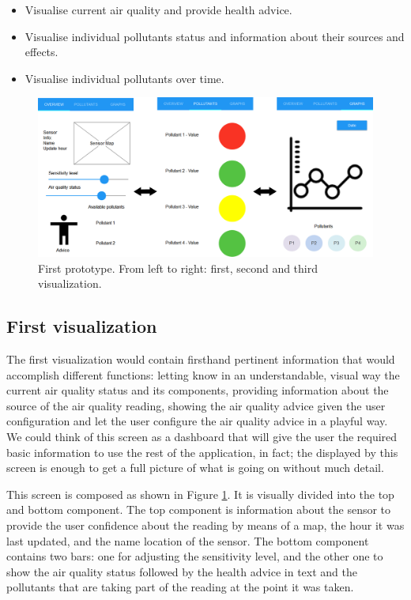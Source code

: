 \begin{itemize}
    \item Visualise current air quality and provide health advice.
    \item Visualise individual pollutants status and information about their sources and effects.
    \item Visualise individual pollutants over time.
\end{itemize}


\begin{figure}[H]
\begin{adjustbox}{width=1.2\textwidth,center=\textwidth}
  \centering
  \includegraphics[scale=1]{images/firstPrototype.png}
\end{adjustbox}
  \caption[Frist prototype]{First prototype. From left to right: first, second and third visualization.}
  \label{fig:first_visualization_first_prototype}
\end{figure}


\subsection{First visualization}

The first visualization would contain firsthand pertinent information that would accomplish different functions: letting know in an understandable, visual way the current air quality status and its components, providing information about the source of the air quality reading, showing the air quality advice given the user configuration and let the user configure the air quality advice in a playful way. We could think of this screen as a dashboard that will give the user the required basic information to use the rest of the application, in fact; the displayed by this screen is enough to get a full picture of what is going on without much detail.

This screen is composed as shown in Figure \ref{fig:first_visualization_first_prototype}. It is visually divided into the top and bottom component. The top component is information about the sensor to provide the user confidence about the reading by means of a map, the hour it was last updated, and the name location of the sensor. The bottom component contains two bars: one for adjusting the sensitivity level, and the other one to show the air quality status followed by the health advice in text and the pollutants that are taking part of the reading at the point it was taken. 

